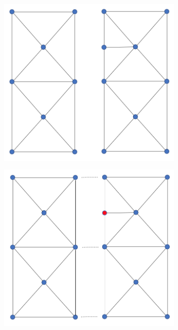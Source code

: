 \documentclass{article}
\begin{document}
\begin{figure}[H] \label{fig:submeshes_align}
  \centering
  \begin{subfigure}[b]{0.3\linewidth}
    \includegraphics[width=\linewidth]{Fig_mesh_align_01.png}
    \caption{}
  \end{subfigure}
  \begin{subfigure}[b]{0.3\linewidth}
    \includegraphics[width=\linewidth]{Fig_mesh_align_02.png}

\end{subfigure}
\end{figure}
\end{document}
